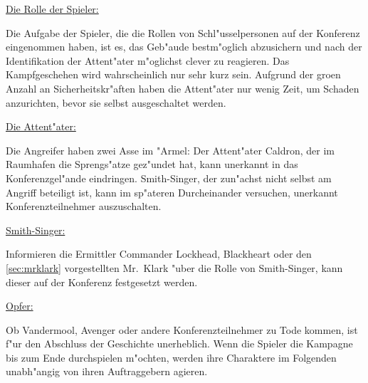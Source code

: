 \begin{remarks}
	\underline{Die Rolle der Spieler:}

	Die Aufgabe der Spieler, die die Rollen von Schl"usselpersonen auf der Konferenz eingenommen haben, ist es, das Geb"aude bestm"oglich abzusichern und nach der Identifikation der Attent"ater m"oglichst clever zu reagieren. Das Kampfgeschehen wird wahrscheinlich nur sehr kurz sein. Aufgrund der gro\3en Anzahl an Sicherheitskr"aften haben die Attent"ater nur wenig Zeit, um Schaden anzurichten, bevor sie selbst ausgeschaltet werden.

	\underline{Die Attent"ater:}
	
	Die Angreifer haben zwei Asse im "Armel: Der Attent"ater Caldron, der im Raumhafen die Sprengs"atze gez"undet hat, kann unerkannt in das Konferenzgel"ande eindringen. Smith-Singer, der zun"achst nicht selbst am Angriff beteiligt ist, kann im sp"ateren Durcheinander versuchen, unerkannt Konferenzteilnehmer auszuschalten.

	\underline{Smith-Singer:}

	Informieren die Ermittler Commander Lockhead, Blackheart oder den \cref{sec:mrklark} vorgestellten Mr.~Klark "uber die Rolle von Smith-Singer, kann dieser auf der Konferenz festgesetzt werden.

	\underline{Opfer:}
	
	Ob Vandermool, Avenger oder andere Konferenzteilnehmer zu Tode kommen, ist f"ur den Abschluss der Geschichte unerheblich. Wenn die Spieler die Kampagne bis zum Ende durchspielen m"ochten, werden ihre Charaktere im Folgenden unabh"angig von ihren Auftraggebern agieren.
\end{remarks}

